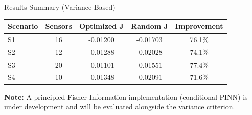 \documentclass[aspectratio=169]{beamer}
\begin{document}
\begin{frame}{Results Summary (Variance-Based)}
\begin{table}
\centering
\begin{tabular}{@{}lcccc@{}}
\toprule
\textbf{Scenario} & \textbf{Sensors} & \textbf{Optimized J} & \textbf{Random J} & \textbf{Improvement} \\
\midrule
S1 & 16 & -0.01200 & -0.01703 & 76.1\% \\
S2 & 12 & -0.01288 & -0.02028 & 74.1\% \\
S3 & 20 & -0.01101 & -0.01551 & 77.4\% \\
S4 & 10 & -0.01348 & -0.02091 & 71.6\% \\
\bottomrule
\end{tabular}
\end{table}

\vspace{0.2cm}
\textbf{Note:} A principled Fisher Information implementation (conditional PINN) is under development and will be evaluated alongside the variance criterion.
\end{frame}
\end{document}
